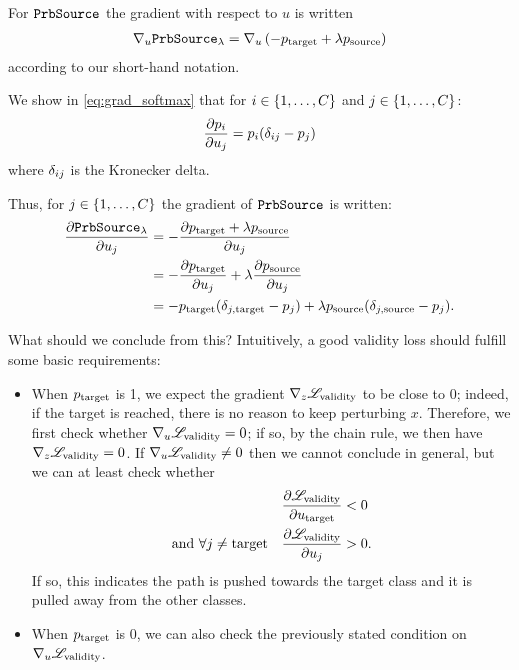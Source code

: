 \documentclass[../main.tex]{subfiles}
\begin{document}
For $\PrbSource{}$ the gradient with respect to $u$ is written
\begin{align*}
    \grad{\PrbSource{\lambda}}{u}
    = \grad{ \left( - p_\target + \lambda p_\source \right) }{u}
\end{align*}
according to our short-hand notation.


We show in \autoref{eq:grad_softmax} that for $i \in \discreteinterval{1}{\outputdim}$ and 
$j \in \discreteinterval{1}{\outputdim}$:
\begin{align*}
    \del{p_i}{u_j} = p_i ( \dij  -  p_j )
\end{align*}
where $\dij$ is the Kronecker delta.

Thus, for $j \in \discreteinterval{1}{\outputdim}$ the gradient of $\PrbSource{}$ is written:
\begin{align*}
    \del{\PrbSource{\lambda}}{u_j}
=  - & \del{p_\target  + \lambda p_\source}{u_j}  \\
=  - & \del{p_\target }{u_j} + \lambda \del{p_\source}{u_j}  \\
=  - & p_\target (\djt - p_j) + \lambda p_\source (\djs - p_j).
\end{align*}

What should we conclude from this?
Intuitively, a good validity loss should fulfill some basic requirements:
\begin{itemize}
    \item When $p_\target$ is 1, we expect the gradient $\grad{\lossval}{z}$ to be close to 0; indeed, if the target is reached, there is no reason to keep perturbing $x$.
    Therefore, we first check whether $\grad{\lossval}{u} = 0$; if so, by the chain rule, we then have $\grad{\lossval}{z} = 0$.
    If $\grad{\lossval}{u} \neq 0$ then we cannot conclude in general, but we can at least check whether 
    \begin{align*}
                                 \del{\lossval}{u_\target} &< 0 \\ 
    \text{and } \forall j \neq \target \quad \del{\lossval}{u_j} &> 0.
    \end{align*}
    If so, this indicates the path is pushed towards the target class
    and it is pulled away from the other classes.

    \item When $p_\target$ is 0, we can also check the previously stated condition on $\grad{\lossval}{u}$.
\end{itemize}
\end{document}
